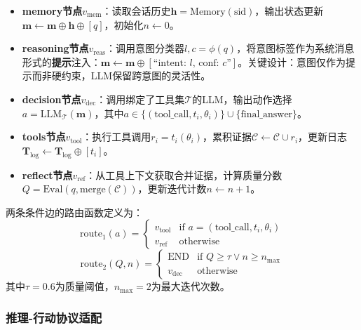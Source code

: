 \documentclass[runningheads]{llncs}
\begin{document}
\begin{itemize}[leftmargin=*]
    \item \textbf{memory节点}$v_{\text{mem}}$：读取会话历史$\mathbf{h} = \text{Memory}(\text{sid})$，输出状态更新$\mathbf{m} \leftarrow \mathbf{m} \oplus \mathbf{h} \oplus [q]$，初始化$n \leftarrow 0$。
    \item \textbf{reasoning节点}$v_{\text{reas}}$：调用意图分类器$l, c = \phi(q)$，将意图标签作为系统消息形式的\textbf{提示}注入：$\mathbf{m} \leftarrow \mathbf{m} \oplus [\text{``intent: } l \text{, conf: } c\text{''}]$。关键设计：意图仅作为提示而非硬约束，LLM保留跨意图的灵活性。
    \item \textbf{decision节点}$v_{\text{dec}}$：调用绑定了工具集$\mathcal{T}$的LLM，输出动作选择$a = \text{LLM}_{\mathcal{T}}(\mathbf{m})$，其中$a \in \{(\text{tool\_call}, t_i, \theta_i)\} \cup \{\text{final\_answer}\}$。
    \item \textbf{tools节点}$v_{\text{tool}}$：执行工具调用$r_i = t_i(\theta_i)$，累积证据$\mathcal{C} \leftarrow \mathcal{C} \cup r_i$，更新日志$\mathbf{T}_{\log} \leftarrow \mathbf{T}_{\log} \oplus [t_i]$。
    \item \textbf{reflect节点}$v_{\text{ref}}$：从工具上下文获取合并证据，计算质量分数$Q = \text{Eval}(q, \text{merge}(\mathcal{C}))$，更新迭代计数$n \leftarrow n + 1$。
\end{itemize}

两条条件边的路由函数定义为：
\begin{equation}
    \text{route}_1(a) = \begin{cases}
    v_{\text{tool}} & \text{if } a = (\text{tool\_call}, t_i, \theta_i) \\
    v_{\text{ref}} & \text{otherwise}
    \end{cases}
\end{equation}
\begin{equation}
    \text{route}_2(Q, n) = \begin{cases}
    \text{END} & \text{if } Q \geq \tau \vee n \geq n_{\max} \\
    v_{\text{dec}} & \text{otherwise}
    \end{cases}
\end{equation}
其中$\tau = 0.6$为质量阈值，$n_{\max} = 2$为最大迭代次数。

\subsubsection{推理-行动协议适配}
\end{document}
